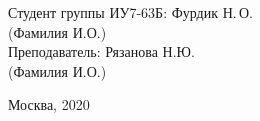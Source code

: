 \begin{titlepage}
	\begin{center}
		\newlength{\ML}
		\hfill Студент группы ИУ7-63Б:\hspace{0.2cm} Фурдик Н.\,О.\\
		\hfill\hspace{1.7cm} (Фамилия И.О.)\\
		\hfill Преподаватель:\hspace{0.2cm} Рязанова Н.Ю.\\
		\hfill\hspace{1.7cm} (Фамилия И.О.)\\
		
	\end{center}
	
	\vspace{0pt plus4fill} %
	{\centering Москва, 2020\par}
\end{titlepage}